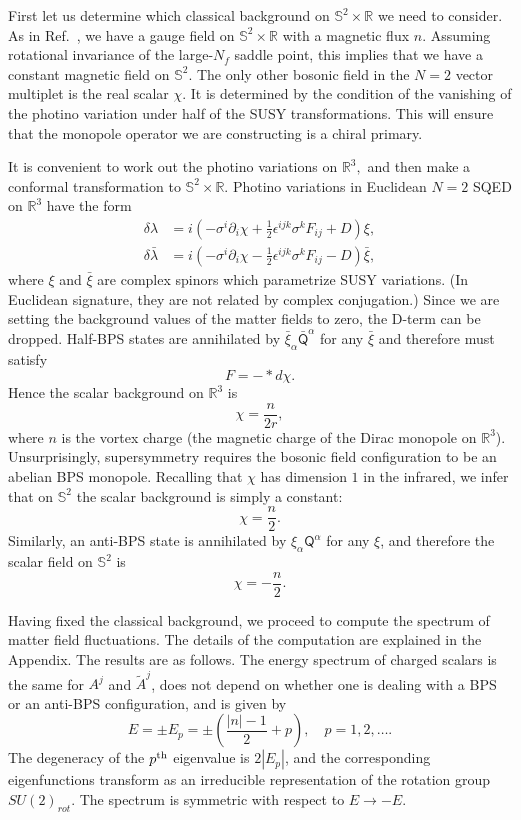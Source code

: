 \documentclass[a4paper,12pt, amsfonts, amssymb]{article}
\newcommand{\RR}{{\mathbb R}}
\renewcommand{\SS}{{\mathbb S}}
\newcommand{\ra}{\rightarrow}
\newcommand{\eps}{\epsilon}
\newcommand{\tA}{{\tilde A}}
\newcommand{\bxi}{{\bar \xi}}
\newcommand{\blambda}{{\bar \lambda}}
\newcommand{\Q}{{\mathsf Q}}
\begin{document}
First let us determine which classical background on $\SS^2\times\RR$ we need
to consider. As in Ref.~\cite{BKWone}, we have a gauge field on 
$\SS^2\times\RR$
with a magnetic flux $n$. Assuming rotational invariance of the 
large-$N_f$ saddle point, this implies that we have a constant magnetic 
field on $\SS^2$. The only other bosonic field in the $N=2$ vector multiplet 
is the real scalar $\chi$. It is determined by the condition of the vanishing of the photino variation under half of the SUSY transformations. This will
ensure that the monopole operator we are constructing is a chiral primary.

It is convenient to work out the photino variations on $\RR^3,$ and then 
make a conformal transformation to $\SS^2\times\RR$. 
Photino variations in Euclidean
$N=2$ SQED on $\RR^3$ have the form
\begin{align*}
\delta\lambda &=i\left(-\sigma^i\partial_i \chi+\frac{1}{2}\eps^{ijk}\sigma^k 
F_{ij}+D\right)\xi,\\
\delta\blambda &=i\left(-\sigma^i\partial_i \chi-\frac{1}{2}\eps^{ijk}\sigma^k
F_{ij}- D\right)\bxi,
\end{align*}
where $\xi$ and $\bxi$ are complex spinors which parametrize SUSY variations.
(In Euclidean signature, they are not related by complex conjugation.)
Since we are setting the background values of the matter fields to zero,
the D-term can be dropped.
Half-BPS states are annihilated by $\bxi_\alpha{\bar\Q}^\alpha$ for any $\bxi$ 
and therefore must satisfy
$$
F=-*d\chi.
$$
Hence the scalar background on $\RR^3$ is
$$
\chi=\frac{n}{2r},
$$
where $n$ is the vortex charge (the magnetic charge of the Dirac monopole 
on $\RR^3$).
Unsurprisingly, supersymmetry requires the bosonic field configuration to be 
an abelian BPS monopole.
Recalling that $\chi$ has dimension $1$ in the infrared, we infer that
on $\SS^2$ the scalar background is simply a constant:
$$
\chi=\frac{n}{2}.
$$
Similarly, an anti-BPS state is annihilated by $\xi_\alpha\Q^\alpha$ for 
any $\xi$, and therefore the scalar field on $\SS^2$ is
$$
\chi=-\frac{n}{2}.
$$

Having fixed the classical background, we proceed to compute the spectrum of matter field fluctuations. The details of the computation are explained in
the Appendix. The results are as follows. The energy spectrum of charged 
scalars is the same for $A^j$ and $\tA^j$, does not
depend on whether one is dealing with a BPS or an anti-BPS configuration, and
is given by
$$
E=\pm E_p=\pm\left(\frac{|n|-1}{2}+p\right),\quad p=1,2,\ldots.
$$
The degeneracy of the $p^{\rm th}$ eigenvalue is $2|E_p|$, and the
corresponding eigenfunctions transform as an irreducible representation of the
rotation group $SU(2)_{rot}$. The spectrum is symmetric with respect to 
$E\ra -E$. 
\end{document}
